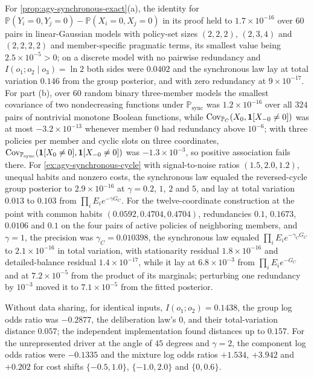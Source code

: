 \begin{numcheck}
For \cref{prop:agy-synchronous-exact}(a), the identity for $\mathbb P(Y_i=0,Y_j=0)-\mathbb P(X_i=0,X_j=0)$ in its proof held to $1.7\times10^{-16}$ over $60$ pairs in linear-Gaussian models with policy-set sizes $(2,2,2)$, $(2,3,4)$ and $(2,2,2,2)$ and member-specific pragmatic terms, its smallest value being $2.5\times10^{-5}>0$; on a discrete model with no pairwise redundancy and $I(o_1;o_2\mid o_3)=\ln2$ both sides were $0.0402$ and the synchronous law lay at total variation $0.146$ from the group posterior, and with zero redundancy at $9\times10^{-17}$. For part (b), over $60$ random binary three-member models the smallest covariance of two nondecreasing functions under $\mathbb P_{\mathrm{sync}}$ was $1.2\times10^{-16}$ over all $324$ pairs of nontrivial monotone Boolean functions, while $\operatorname{Cov}_{\mathbb P_C}(X_0,\mathbf 1[X_{-0}\ne0])$ was at most $-3.2\times10^{-13}$ whenever member $0$ had redundancy above $10^{-6}$; with three policies per member and cyclic slots on three coordinates, $\operatorname{Cov}_{\mathbb P_{\mathrm{sync}}}(\mathbf 1[X_0\ne0],\mathbf 1[X_{-0}\ne0])$ was $-1.3\times10^{-3}$, so positive association fails there. For \cref{ex:agy-synchronous-cycle} with signal-to-noise ratios $(1.5,2.0,1.2)$, unequal habits and nonzero costs, the synchronous law equaled the reversed-cycle group posterior to $2.9\times10^{-16}$ at $\gamma=0.2$, $1$, $2$ and $5$, and lay at total variation $0.013$ to $0.103$ from $\prod_iE_ie^{-\gamma G_C}$. For the twelve-coordinate construction at the point with common habits $(0.0592,0.4704,0.4704)$, redundancies $0.1$, $0.1673$, $0.0106$ and $0.1$ on the four pairs of active policies of neighboring members, and $\gamma=1$, the precision was $\gamma_C=0.010398$, the synchronous law equaled $\prod_iE_ie^{-\gamma_CG_C}$ to $2.1\times10^{-16}$ in total variation, with stationarity residual $1.8\times10^{-16}$ and detailed-balance residual $1.4\times10^{-17}$, while it lay at $6.8\times10^{-3}$ from $\prod_iE_ie^{-G_C}$ and at $7.2\times10^{-5}$ from the product of its marginals; perturbing one redundancy by $10^{-3}$ moved it to $7.1\times10^{-5}$ from the fitted posterior.

Without data sharing, for identical inputs, $I(o_1;o_2)=0.1438$, the group log odds ratio was $-0.2877$, the deliberation law's $0$, and their total-variation distance $0.057$; the independent implementation found distances up to $0.157$. For the unrepresented driver at the angle of $45$ degrees and $\gamma=2$, the component log odds ratios were $-0.1335$ and the mixture log odds ratios $+1.534$, $+3.942$ and $+0.202$ for cost shifts $\{-0.5,1.0\}$, $\{-1.0,2.0\}$ and $\{0,0.6\}$.
\end{numcheck}

